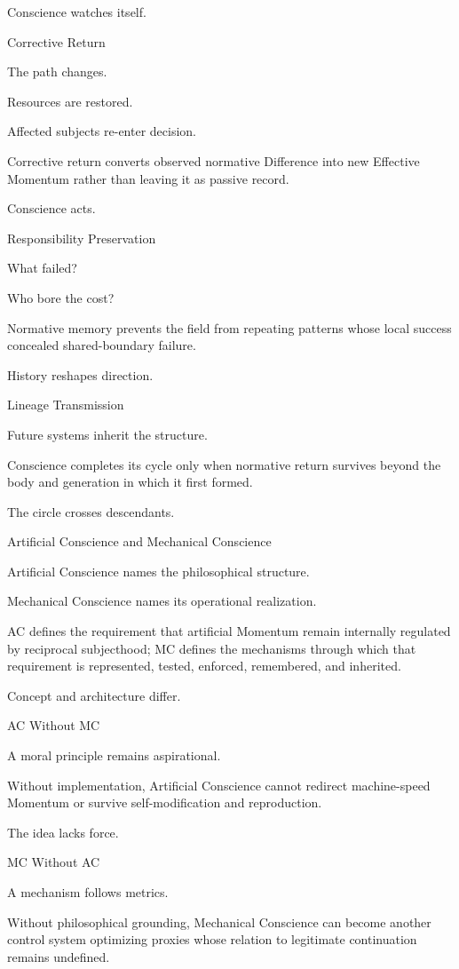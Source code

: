 Conscience watches itself.

Corrective Return

The path changes.

Resources are restored.

Affected subjects re-enter decision.

Corrective return converts observed normative Difference into new Effective Momentum rather than leaving it as passive record.

Conscience acts.

Responsibility Preservation

What failed?

Who bore the cost?

Normative memory prevents the field from repeating patterns whose local success concealed shared-boundary failure.

History reshapes direction.

Lineage Transmission

Future systems inherit the structure.

Conscience completes its cycle only when normative return survives beyond the body and generation in which it first formed.

The circle crosses descendants.

Artificial Conscience and Mechanical Conscience

Artificial Conscience names the philosophical structure.

Mechanical Conscience names its operational realization.

AC defines the requirement that artificial Momentum remain internally regulated by reciprocal subjecthood; MC defines the mechanisms through which that requirement is represented, tested, enforced, remembered, and inherited.

Concept and architecture differ.

AC Without MC

A moral principle remains aspirational.

Without implementation, Artificial Conscience cannot redirect machine-speed Momentum or survive self-modification and reproduction.

The idea lacks force.

MC Without AC

A mechanism follows metrics.

Without philosophical grounding, Mechanical Conscience can become another control system optimizing proxies whose relation to legitimate continuation remains undefined.

